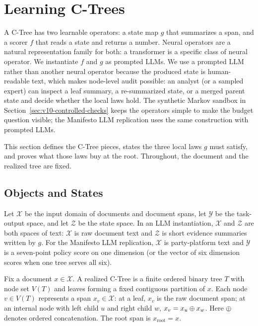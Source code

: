 \section{Learning C-Trees}\label{sec:v8-ctree-math}

A C-Tree has two learnable operators: a state map \(g\) that
summarizes a span, and a scorer \(f\) that reads a state and
returns a number. Neural operators are a natural representation
family for both: a transformer is a specific class of neural
operator. We instantiate \(f\) and \(g\) as prompted LLMs. We use a prompted LLM rather than another neural
operator because the produced state is human-readable text, which
makes node-level audit possible: an analyst (or a sampled expert)
can inspect a leaf summary, a re-summarized state, or a merged
parent state and decide whether the local laws hold. The synthetic
Markov sandbox in Section~\ref{sec:v10-controlled-checks} keeps the
operators simple to make the budget question visible; the
Manifesto LLM replication uses the same construction with prompted
LLMs.

This section defines the C-Tree pieces, states the three local
laws \(g\) must satisfy, and proves what those laws buy at the
root. Throughout, the document and the realized tree are fixed.

\subsection{Objects and States}

Let \(\mathcal X\) be the input domain of documents and document
spans, let \(\mathcal Y\) be the task-output space, and let
\(\mathcal Z\) be the state space. In an LLM instantiation,
\(\mathcal X\) and \(\mathcal Z\) are both spaces of text:
\(\mathcal X\) is raw document text and \(\mathcal Z\) is short
evidence summaries written by \(g\). For the Manifesto LLM
replication, \(\mathcal X\) is party-platform text and \(\mathcal Y\)
is a seven-point policy score on one dimension (or the vector of six
dimension scores when one tree serves all six).

Fix a document \(x\in\mathcal X\). A realized C-Tree is a finite
ordered binary tree \(T\) with node set \(V(T)\) and leaves forming a
fixed contiguous partition of \(x\). Each node \(v\in V(T)\) represents
a span \(x_v\in\mathcal X\): at a leaf, \(x_v\) is the raw document
span; at an internal node with left child \(u\) and right child \(w\),
\(x_v=x_u\oplus x_w\). Here \(\oplus\) denotes ordered concatenation.
The root span is \(x_{\mathrm{root}}=x\).

